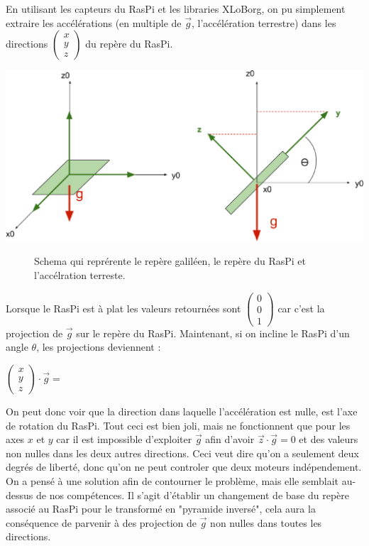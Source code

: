 \documentclass[twoside,twocolumn, 16pt]{article}
\newcommand{\icol}[1]{%
  \left(\begin{smallmatrix}#1\end{smallmatrix}\right)%
}
\begin{document}
En utilisant les capteurs du RasPi et les libraries XLoBorg, on pu simplement extraire les accélérations (en multiple de $\vec{g}$, l'accélération terrestre) dans les directions $\icol{x\\y\\z}$ du repère du RasPi. 
\begin{center}
\includegraphics [scale = 0.23] {acc.eps}
\begin{figure}[!h]
\caption{Schema qui reprérente le repère galiléen, le repère du RasPi et l'accélration terreste.}
\end{figure}
\end{center}
Lorsque le RasPi est à plat les valeurs retournées sont $\icol{0\\0\\1}$ car c'est la projection de $\vec{g}$ sur le repère du RasPi. Maintenant, si on incline le RasPi d'un angle $\theta$, les projections deviennent :
\begin{center}
$\icol{x\\y\\z} \cdot \vec{g} =$
 \\
\end{center}
\indent On peut donc voir que la direction dans laquelle l'accélération est nulle, est l'axe de rotation du RasPi. Tout ceci est bien joli, mais ne fonctionnent que pour les axes $x$ et $y$ car il est impossible d'exploiter $\vec{g}$ afin d'avoir  $\vec{z} \cdot \vec{g} = 0$ et des valeurs non nulles dans les deux autres directions. Ceci veut dire qu'on a seulement deux degrés de liberté, donc qu'on ne peut controler que deux moteurs indépendement. \\
\indent On a pensé à une solution afin de contourner le problème, mais elle semblait au-dessus de nos compétences. Il s'agit d'établir un changement de base du repère associé au RasPi pour le transformé en "pyramide inversé", cela aura la conséquence de parvenir à des projection de $\vec{g}$ non nulles dans toutes les directions. 
\end{document}
